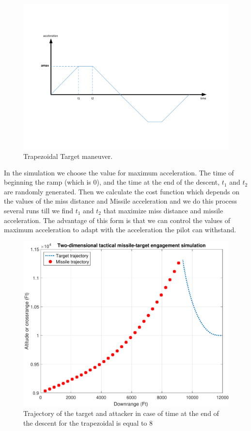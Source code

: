 \begin{figure}[htb]
	\centering
	\includegraphics[scale = 0.75]{fig/trapezoidalacc.pdf}
	\caption{Trapezoidal Target maneuver.}
	\label{trapezoidalacc}
\end{figure}
In the simulation we choose the value for maximum acceleration. The time of beginning the ramp (which is 0), and the time at the end of the descent, $t_1$ and $t_2$ are randomly generated. Then we calculate the cost function which depends on the values of the miss distance and Missile acceleration and we do this process several runs till we find $t_1$ and $t_2$ that maximize miss distance and missile acceleration.   
The advantage of this form is that we can control the values of maximum acceleration to adapt with the acceleration the pilot can withstand.

\begin{figure}[htb]
	\centering
	\includegraphics[scale = 0.75]{fig/trajectoryT1.pdf}
	\caption{Trajectory of the target and attacker in case of time at the end of the descent for the trapezoidal is equal to 8 }
	\label{trajectoryT1}
\end{figure}


